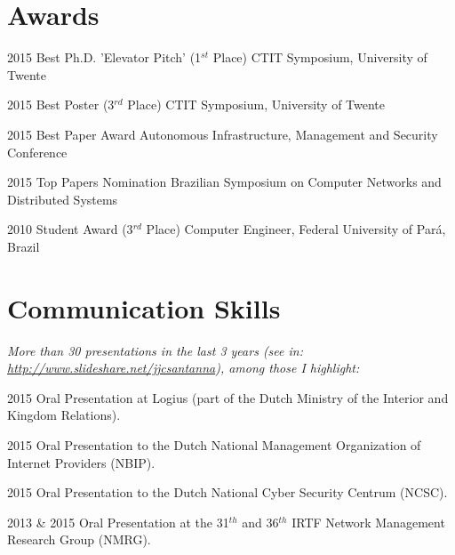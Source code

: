 \documentclass[print]{friggeri-cv} %
\begin{document}
\section{Awards}

\begin{entrylist}
\vspace{-0.3cm}
\entry
{2015}
{Best Ph.D. 'Elevator Pitch' (1$^{st}$ Place)}
{CTIT Symposium, University of Twente}

\vspace{-0.3cm}
\entry
{2015}
{Best Poster (3$^{rd}$ Place)}
{CTIT Symposium, University of Twente}

\vspace{-0.3cm}
\entry
{2015}
{Best Paper Award}
{Autonomous Infrastructure, Management and Security Conference}

\vspace{-0.3cm}
\entry
{2015}
{Top Papers Nomination}
{Brazilian Symposium on Computer Networks and Distributed Systems}

\vspace{-0.3cm}
\entry
{2010}
{Student Award (3$^{rd}$ Place)}
{Computer Engineer, Federal University of Pará, Brazil}

\end{entrylist}


\section{Communication Skills}
\emph{More than 30 presentations in the last 3 years (see in: \href{http://www.slideshare.net/jjcsantanna}{http://www.slideshare.net/jjcsantanna}), among those I highlight:}

\begin{entrylist}

\vspace{-0.3cm}
\entry
{2015}
{Oral Presentation}
{at Logius (part of the Dutch Ministry of the Interior and Kingdom Relations).}

\vspace{-0.3cm}
\entry
{2015}
{Oral Presentation}
{to the Dutch National Management Organization of Internet Providers (NBIP).}

\vspace{-0.3cm}
\entry
{2015}
{Oral Presentation}
{to the Dutch National Cyber Security Centrum (NCSC).}

\vspace{-0.3cm}
\entry
{2013 \& 2015}
{Oral Presentation}
{at the 31$^{th}$ and 36$^{th}$ IRTF Network Management Research Group (NMRG).}

\end{entrylist}
\end{document}
